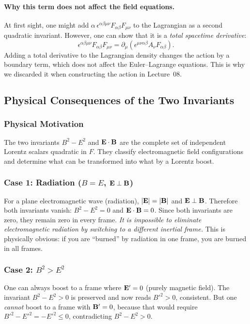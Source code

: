 \paragraph{Why this term does not affect the field equations.}
At first sight, one might add $\alpha\,\epsilon^{\alpha\beta\mu\nu}F_{\alpha\beta}F_{\mu\nu}$ to the
Lagrangian as a second quadratic invariant.  However, one can show that it is a \emph{total
spacetime derivative}:
\begin{equation}\label{eq:lec10:I2-total-deriv}
  \epsilon^{\alpha\beta\mu\nu}F_{\alpha\beta}F_{\mu\nu}
  =
  \partial_\mu\!\left(\epsilon^{\mu\nu\alpha\beta}A_\nu F_{\alpha\beta}\right).
\end{equation}
Adding a total derivative to the Lagrangian density changes the action by a boundary term, which does
not affect the Euler--Lagrange equations.  This is why we discarded it when constructing the action
in Lecture~08.

\subsection{Physical Consequences of the Two Invariants}\label{subsec:lec10-consequences}

\subsubsection*{Physical Motivation}
The two invariants $B^2-E^2$ and $\mathbf{E}\cdot\mathbf{B}$ are the complete set of independent Lorentz scalars
quadratic in $F$.  They classify electromagnetic field configurations and determine what can be
transformed into what by a Lorentz boost.

\subsubsection*{Case 1: Radiation ($B=E$, $\mathbf{E}\perp\mathbf{B}$)}
For a plane electromagnetic wave (radiation), $|\mathbf{E}|=|\mathbf{B}|$ and $\mathbf{E}\perp\mathbf{B}$.  Therefore both
invariants vanish: $B^2-E^2=0$ and $\mathbf{E}\cdot\mathbf{B}=0$.  Since both invariants are zero, they remain
zero in every frame.  \emph{It is impossible to eliminate electromagnetic radiation by switching to
a different inertial frame.}  This is physically obvious: if you are ``burned'' by radiation in one
frame, you are burned in all frames.

\subsubsection*{Case 2: $B^2>E^2$}
One can always boost to a frame where $\mathbf{E}'=0$ (purely magnetic field).  The invariant
$B^2-E^2>0$ is preserved and now reads $B'^2>0$, consistent.  But one \emph{cannot} boost to a frame
with $\mathbf{B}'=0$, because that would require $B'^2-E'^2=-E'^2\leq 0$, contradicting $B^2-E^2>0$.

